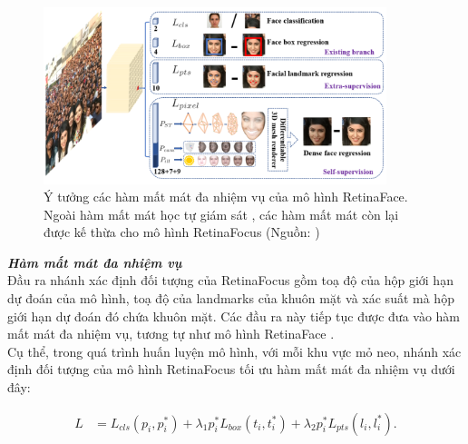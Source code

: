 {    \begin{figure}[H]
        \centering
        \includegraphics[width=10cm] {images/retinaface_loss_funcs}
        \caption{Ý tưởng các hàm mất mát đa nhiệm vụ của mô hình RetinaFace. Ngoài hàm mất mát học tự giám sát \cite{zhou2019dense, genova2018unsupervised}, các hàm mất mát còn lại được kế thừa cho mô hình RetinaFocus (Nguồn: \cite{deng2020retinaface})}
        \label{fig:retinaface_loss_funcs}
    \end{figure}

    \noindent
    \textbf{\textit{Hàm mất mát đa nhiệm vụ}} \\
    Đầu ra nhánh xác định đối tượng của RetinaFocus gồm toạ độ của hộp giới hạn dự đoán của mô hình, toạ độ của landmarks của khuôn mặt và xác suất mà hộp giới hạn dự đoán đó chứa khuôn mặt.
    Các đầu ra này tiếp tục được đưa vào hàm mất mát đa nhiệm vụ, tương tự như mô hình RetinaFace \cite{deng2020retinaface}. \\
    Cụ thể, trong quá trình huấn luyện mô hình, với mỗi khu vực mỏ neo, nhánh xác định đối tượng của mô hình RetinaFocus tối ưu hàm mất mát đa nhiệm vụ dưới đây:

    \begin{equation}
        \begin{split}
        L  & =  L_{cls}(p_i, p^{*}_i) + \lambda_1 p^{*}_i L_{box}(t_i, t^{*}_i) + \lambda_2 p^{*}_i L_{pts} (l_i, l^{*}_i).\\
        \end{split}
        \label{eq:retinaface_loss}
    \end{equation}

}
